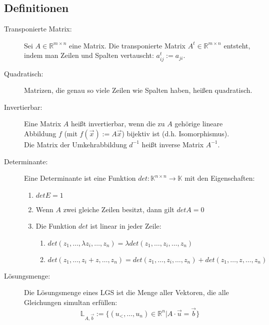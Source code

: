 \subsection*{Definitionen}
\begin{description}
  \item [Transponierte Matrix:]
    Sei $A \in \mathbb{R}^{m \times n}$ eine Matrix. Die transponierte Matrix 
    $A^t \in \mathbb{R}^{m \times n}$ entsteht, indem man Zeilen und Spalten 
    vertauscht: $a^t_{ij} := a_{ji}$.

  \item [Quadratisch:]
    Matrizen, die genau so viele Zeilen wie Spalten haben, heißen quadratisch.

  \item [Invertierbar:]
    Eine Matrix $A$ heißt invertierbar, wenn die zu $A$ gehörige lineare
    Abbildung $f$ (mit $f(\vec{x}) := A\vec{x}$) bijektiv ist 
    (d.h. Isomorphismus).\\
    Die Matrix der Umkehrabbildung $d^{-1}$ heißt inverse Matrix $A^{-1}$.

  \item [Determinante:]
    Eine Determinante ist eine Funktion 
    $det: \mathbb{K}^{n \times n} \rightarrow \mathbb{K}$ mit den Eigenschaften:
    \begin{enumerate}
      \item $det E = 1$
      \item Wenn $A$ zwei gleiche Zeilen besitzt, dann gilt $det A = 0$
      \item Die Funktion $det$ ist linear in jeder Zeile:
      \begin{enumerate}
        \item $det(z_1,\dots,\lambda z_i,\dots,z_n) = 
              \lambda det(z_1,\dots,z_i,\dots,z_n)$
        \item $det(z_1,\dots,z_i+z,\dots,z_n) = 
              det(z_1,\dots,z_i,\dots,z_n) + det(z_1,\dots,z,\dots,z_n)$
      \end{enumerate}
    \end{enumerate}

  \item [Lösungsmenge:]
    Die Lösungsmenge eines LGS ist die Menge aller Vektoren, die alle
    Gleichungen simultan erfüllen:
    \begin{equation*}
      \mathbb{L}_{A,\vec{b}} := 
      \{(u_<, \dots,u_n) \in \mathbb{R}^n | A \cdot \vec{u} = \vec{b}\}
    \end{equation*}


\end{description}
